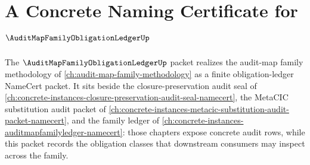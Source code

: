 \chapter{A Concrete Naming Certificate for $\AuditMapFamilyObligationLedgerUp$}
\label{ch:concrete-instances-auditmapfamilyobligationledger-namecert}

The $\AuditMapFamilyObligationLedgerUp$ packet realizes the audit-map family methodology of \autoref{ch:audit-map-family-methodology} as a finite obligation-ledger NameCert packet. It sits beside the closure-preservation audit seal of \autoref{ch:concrete-instances-closure-preservation-audit-seal-namecert}, the MetaCIC substitution audit packet of \autoref{ch:concrete-instances-metacic-substitution-audit-packet-namecert}, and the family ledger of \autoref{ch:concrete-instances-auditmapfamilyledger-namecert}: those chapters expose concrete audit rows, while this packet records the obligation classes that downstream consumers may inspect across the family.

